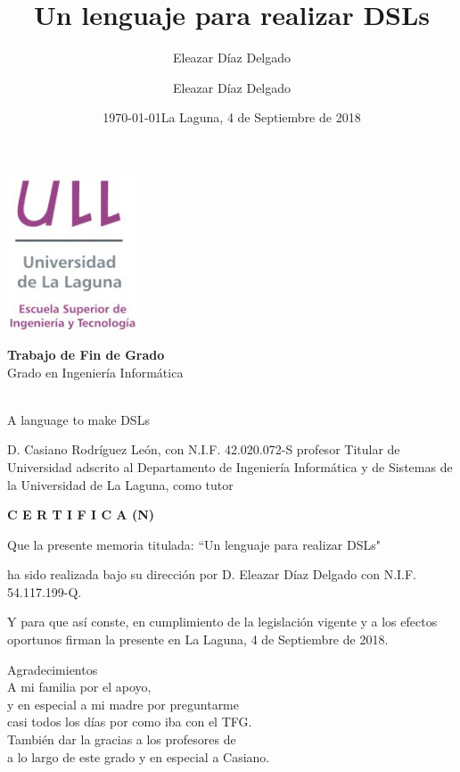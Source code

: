 \documentclass[11pt]{article}
\author{Eleazar Díaz Delgado }
\date{\today}
\title{}
\begin{document}
\title{Un lenguaje para realizar DSLs}
\author{Eleazar Díaz Delgado}

\date{La Laguna, 4 de Septiembre de 2018}

\makeatletter
\begin{titlepage}
    \includegraphics[width=40mm]{ull-logo.jpg}\\[4ex]
    \begin{center}
        {\huge \bfseries  Trabajo de Fin de Grado }\\[2ex]
        {\LARGE  Grado en Ingeniería Informática}\\[10ex]
    \end{center}
    \begin{flushright}
        {\huge \bfseries  \@title }\\[2ex]
        {\huge  A language to make DSLs }\\[2ex]
        {\LARGE  \@author}
    \end{flushright}
    \vfill
    \begin{center}
        {\LARGE \@date}
    \end{center}

\end{titlepage}
\makeatother
\thispagestyle{empty}
\newpage


D. Casiano Rodríguez León, con N.I.F. 42.020.072-S profesor Titular de Universidad adscrito al Departamento de Ingeniería Informática y de Sistemas de la Universidad de La Laguna, como tutor

{\large \bfseries C E R T I F I C A (N)}

Que la presente memoria titulada: “Un lenguaje para realizar DSLs"

ha sido realizada bajo su dirección por D. Eleazar Díaz Delgado
con N.I.F. 54.117.199-Q.

Y para que así conste, en cumplimiento de la legislación vigente y a los efectos oportunos firman la presente en La Laguna, 4 de Septiembre de 2018.
\newpage
\begin{flushright}
    {\huge  Agradecimientos }\\[2ex]
    A mi familia por el apoyo, \\
    y en especial a mi madre por preguntarme \\
    casi todos los días por como iba con el TFG. \\
    \vspace{10mm} %
    También dar la gracias a los profesores de \\
    a lo largo de este grado y en especial a Casiano. \\
\end{flushright}
\end{document}
